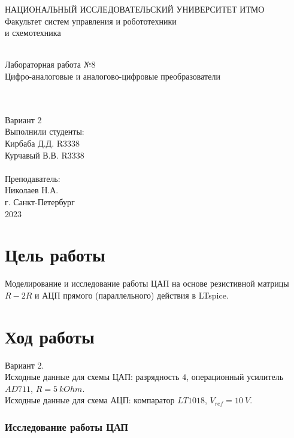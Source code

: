 \documentclass[12pt]{article}
\begin{document}
\begin{titlepage}
\begin{center}
    {\small НАЦИОНАЛЬНЫЙ ИССЛЕДОВАТЕЛЬСКИЙ УНИВЕРСИТЕТ ИТМО} \\
    {\small Факультет систем управления и робототехники} \\
    \vspace*{10\baselineskip}
    { и схемотехника} \\
    \ \\
    \begin{spacing}{1.5}
    {\large Лабораторная работа №8 \\
    Цифро-аналоговые и аналогово-цифровые преобразователи} \\
    \end{spacing} \\
    \ \\
    Вариант 2 \\
    \vspace*{10\baselineskip}
    \hfill {Выполнили студенты:} \\
    \hfill {Кирбаба Д.Д. R3338} \\
    \hfill {Курчавый В.В. R3338} \\
    \ \\
    \hfill {Преподаватель:} \\
    \hfill {Николаев Н.А.} \\
    \mbox{}
    \vfill {г. Санкт-Петербург\\2023}
\end{center}
\end{titlepage}

\section*{Цель работы}
Моделирование и исследование работы ЦАП на основе резистивной матрицы $R-2R$ и АЦП прямого (параллельного) действия в LTspice.

\section*{Ход работы}
Вариант 2.\\
Исходные данные для схемы ЦАП: разрядность $4$, операционный усилитель $AD711$, $R = 5 \ kOhm$. \\
Исходные данные для схема АЦП: компаратор $LT1018$, $V_{ref} = 10 \ V$.

\subsubsection*{Исследование работы ЦАП}
\end{document}
